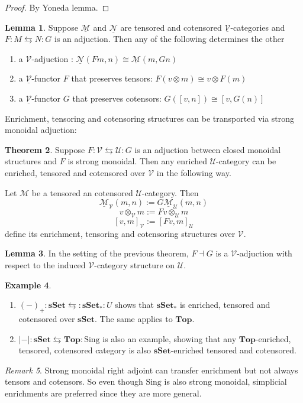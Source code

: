 \documentclass[11pt]{article}
\theoremstyle{definition}
\newtheorem{theorem}{Theorem}[part]
\newtheorem{lemma}[theorem]{Lemma}
\newtheorem{example}[theorem]{Example}
\theoremstyle{remark}
\newtheorem{remark}[theorem]{Remark}
\newcommand{\Top}{\mathbf{Top}}
\newcommand{\calM}{\mathcal{M}}
\newcommand{\ucalM}{\underline{\mathcal{M}}}
\newcommand{\ucalN}{\underline{\mathcal{N}}}
\newcommand{\calU}{\mathcal{U}}
\newcommand{\calV}{\mathcal{V}}
\newcommand{\ucalV}{\underline{\mathcal{V}}}
\begin{document}
\begin{proof}
    By Yoneda lemma.
\end{proof}

\begin{lemma}
    Suppose $\ucalM$ and $\ucalN$ are tensored and cotensored $\ucalV$-categories and
    $F : M \leftrightarrows N : G$ is an adjuction. Then any of the following determines the other
    \begin{enumerate}
        \item a $\calV$-adjuction : $\ucalN(Fm,n) \cong \ucalM(m,Gn)$
        \item a $\ucalV$-functor $F$ that preserves tensors: $F(v\otimes m) \cong v \otimes F(m)$
        \item a $\ucalV$-functor $G$ that preserves cotensors: $G([v,n])\cong [v,G(n)]$
    \end{enumerate}
\end{lemma}

Enrichment, tensoring and cotensoring structures can be transported via strong monoidal adjuction:
\begin{theorem}
    Suppose $F : \calV \leftrightarrows \calU : G$ is an adjuction between closed monoidal structures
    and $F$ is strong monoidal. Then any enriched $\calU$-category can be enriched, tensored and cotensored over $\calV$
    in the following way.
    
    Let $\calM$ be a tensored an cotensored $\calU$-category.
    Then
    $$\ucalM_{\calV}(m,n) := G\ucalM_{\calU}(m,n)$$
    $$v \otimes_{\calV} m := Fv \otimes_{\calU} m$$
    $$[v,m]_{\calV} := [Fv, m]_{\calU}$$
    define its enrichment, tensoring and cotensoring structures over $\calV$.
\end{theorem}

\begin{lemma}
    In the setting of the previous theorem, $F\dashv G$ is a $\calV$-adjuction
    with respect to the induced $\calV$-category structure on $\calU$.
\end{lemma}

\begin{example}
    \begin{enumerate}
        \item $(-)_+ : \textbf{sSet} \leftrightarrows : \textbf{sSet}_* : U$ shows that $\textbf{sSet}_*$
            is enriched, tensored and cotensored over $\textbf{sSet}$. The same applies to $\Top$.
        \item $|-| : \textbf{sSet} \leftrightarrows \Top : \text{Sing}$ is also an example, showing that
            any $\Top$-enriched, tensored, cotensored category is also $\textbf{sSet}$-enriched tensored and cotensored.
    \end{enumerate}
\end{example}

\begin{remark}
    Strong monoidal right adjoint can transfer enrichment but not always tensors and cotensors.
    So even though $\text{Sing}$ is also strong monoidal, simplicial enrichments are preferred
    since they are more general.
\end{remark}
\end{document}
